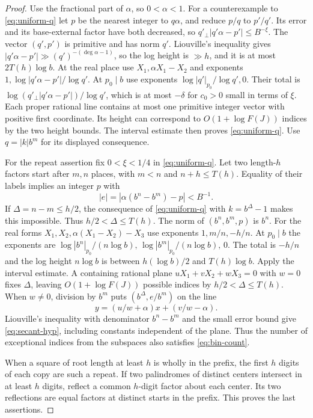 \begin{proof}
Use the fractional part of \(\alpha\), so \(0<\alpha<1\).
For a counterexample to \eqref{eq:uniform-q} let \(p\) be
the nearest integer to \(q\alpha\), and reduce \(p/q\) to
\(p'/q'\). Its error and its base-external factor have
both decreased, so \(q'_\perp |q'\alpha-p'|\le B^{-\xi}\).
The vector \((q',p')\) is primitive and has norm \(q'\).
Liouville's inequality gives
\(|q'\alpha-p'|\gg (q')^{-(\deg\alpha-1)}\), so the log height
is \(\gg h\), and it is at most \(2T(h)\log b\).
At the real place use \(X_1,\alpha X_1-X_2\) and exponents
\(1,\log|q'\alpha-p'|/\log q'\).
At \(p_0\mid b\) use exponents
\(\log|q'|_{p_0}/\log q',0\). Their total is
\(\log(q'_\perp|q'\alpha-p'|)/\log q'\), which is at most
\(-\delta\) for \(c_0>0\) small in terms of \(\xi\).
Each proper rational line contains at most one primitive
integer vector with positive first coordinate. Its height
can correspond to \(O(1+\log F(J))\) indices by the two height
bounds. The interval estimate then proves \eqref{eq:uniform-q}.
Use \(q=|k|b^m\) for its displayed consequence.

For the repeat assertion fix \(0<\xi<1/4\) in
\eqref{eq:uniform-q}. Let two length-\(h\) factors start after
\(m,n\) places, with \(m<n\) and \(n+h\le T(h)\).
Equality of their labels implies an integer \(p\) with
\[
 |e|=|\alpha(b^n-b^m)-p|<B^{-1}.
\]
If \(\Delta=n-m\le h/2\), the consequence of \eqref{eq:uniform-q}
with \(k=b^\Delta-1\) makes this impossible. Thus \(h/2<\Delta\le
T(h)\). The norm of \((b^n,b^m,p)\) is \(b^n\).
For the real forms
\(X_1,X_2,\alpha(X_1-X_2)-X_3\) use exponents
\(1,m/n,-h/n\). At \(p_0\mid b\) the exponents are
\(\log|b^n|_{p_0}/(n\log b),\,\log|b^m|_{p_0}/(n\log b),\,0\).
The total is \(-h/n\) and the log height
\(n\log b\) is between \(h(\log b)/2\) and \(T(h)\log b\).
Apply the interval estimate. A containing rational plane
\(uX_1+vX_2+wX_3=0\) with \(w=0\) fixes \(\Delta\), leaving
\(O(1+\log F(J))\) possible indices by \(h/2<\Delta\le T(h)\).
When \(w\ne0\), division by \(b^m\) puts
\((b^\Delta,e/b^m)\) on the line
\[
 y=(u/w+\alpha)x+(v/w-\alpha).
\]
Liouville's inequality with denominator \(b^n-b^m\) and the small
error bound give \eqref{eq:secant-hyp}, including constants
independent of the plane. Thus the number of exceptional indices
from the subspaces also satisfies \eqref{eq:bin-count}.

When a square of root length at least \(h\) is wholly in the
prefix, the first \(h\) digits of each copy are such a repeat.
If two palindromes of distinct centers intersect in at least \(h\)
digits, reflect a common \(h\)-digit factor about each center.
Its two reflections are equal factors at distinct starts in the
prefix. This proves the last assertions.
\end{proof}

